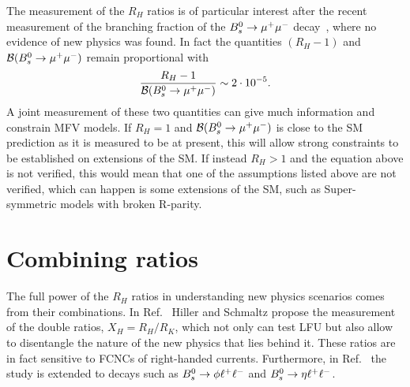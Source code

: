 The measurement of the $R_H$ ratios is of particular interest after the recent
measurement of the branching fraction of the ${{B}^0_{s}}\rightarrow{\ensuremath{\mu^+\mu^-}}$ decay~\cite{CMS:2014xfa}, 
where no evidence of new physics was found. In fact the quantities $(R_H - 1)$ and
${\cal B}({{B}^0_{s}} \rightarrow {\ensuremath{\mu^+\mu^-}})$ remain proportional with
%
\begin{equation}
\frac{R_H - 1}{{\cal B}({{B}^0_{s}} \rightarrow {\ensuremath{\mu^+\mu^-}})} \sim 2 \cdot 10^{-5}.
\end{equation}
%
A joint measurement of these two quantities can give much information and constrain MFV models.
If $R_H = 1$ and ${\cal B}({{B}^0_{s}} \rightarrow {\ensuremath{\mu^+\mu^-}})$ is close to the SM prediction as it is measured to be at present, 
this will allow strong constraints to be established on extensions of the SM.
If instead $R_H > 1$ and the equation above is not verified, this would mean that one of the
assumptions listed above are not verified, which can happen is some extensions of the SM, such
as Super-symmetric models with broken R-parity.

\section{Combining ratios}

The full power of the $R_H$ ratios in understanding new physics scenarios comes from
their combinations.  In Ref.~\cite{Hiller:2014ula} Hiller and Schmaltz propose the measurement 
of the double ratios, $X_H = R_H / R_K$, which not only can test LFU but also allow
to disentangle the nature of the new physics that lies behind it. These ratios are in fact sensitive
to FCNCs of right-handed currents. Furthermore, in Ref.~\cite{Hiller:2014ula} the study is extended
to \Bs decays such as ${{B}^0_{s}}\rightarrow\phi\ell^+ \ell^-$ and $\Bs\to\eta\ll$.

